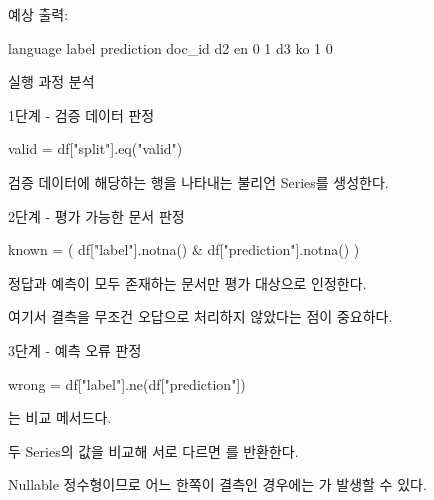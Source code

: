 예상 출력:

\begin{dhkzsh}
       language  label  prediction
doc_id
d2           en      0           1
d3           ko      1           0
\end{dhkzsh}

\begin{dhknote}
\begin{dhksmry}[centered]
실행 과정 분석
\end{dhksmry}
\end{dhknote}

\begin{dhknote}
\begin{dhksmry}[centered]
1단계 - 검증 데이터 판정
\end{dhksmry}
\end{dhknote}

\begin{dhkcode}
valid = df["split"].eq("valid")
\end{dhkcode}

검증 데이터에 해당하는 행을 나타내는 불리언 Series를 생성한다.

\begin{dhknote}
\begin{dhksmry}[centered]
2단계 - 평가 가능한 문서 판정
\end{dhksmry}
\end{dhknote}

\begin{dhkcode}
known = (
    df["label"].notna()
    & df["prediction"].notna()
)
\end{dhkcode}

정답과 예측이 모두 존재하는 문서만 평가 대상으로 인정한다.

여기서 결측을 무조건 오답으로 처리하지 않았다는 점이 중요하다.

\begin{dhknote}
\begin{dhksmry}[centered]
3단계 - 예측 오류 판정
\end{dhksmry}
\end{dhknote}

\begin{dhkcode}
wrong = df["label"].ne(df["prediction"])
\end{dhkcode}

는  비교 메서드다.

두 Series의 값을 비교해 서로 다르면 를 반환한다.

Nullable 정수형이므로 어느 한쪽이 결측인 경우에는 가 발생할 수 있다.

